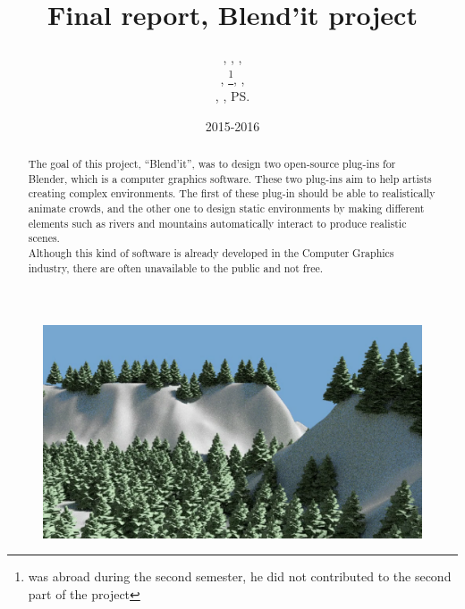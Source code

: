 \documentclass[a4paper,11pt]{article}
\title{Final report, Blend'it project}
\author{\bb, \gc, \dl,\\ \vl, \om\footnote{was abroad during the second semester, he did not contributed to the second part of the project}, \mr,\\ \me, \js, \ps}
\date{2015-2016}
\begin{document}
\maketitle

\begin{figure}[h!]
\centerline{\includegraphics[scale=0.3]{img/demo.png}}
\end{figure}
\begin{abstract}
The goal of this project, ``Blend'it'', was to design two open-source plug-ins for Blender, which is a computer graphics software. These two plug-ins aim to help artists creating complex environments. The first of these plug-in should be able to realistically animate crowds, and the other one to design static environments by making different elements such as rivers and mountains automatically interact to produce realistic scenes. \\
Although this kind of software is already developed in the Computer Graphics industry, there are often unavailable to the public and not free.
\end{abstract}

\newpage
{}

\tableofcontents

\newpage


\newpage


\newpage


\newpage


\newpage




\newpage
\begingroup




\endgroup
\end{document}
